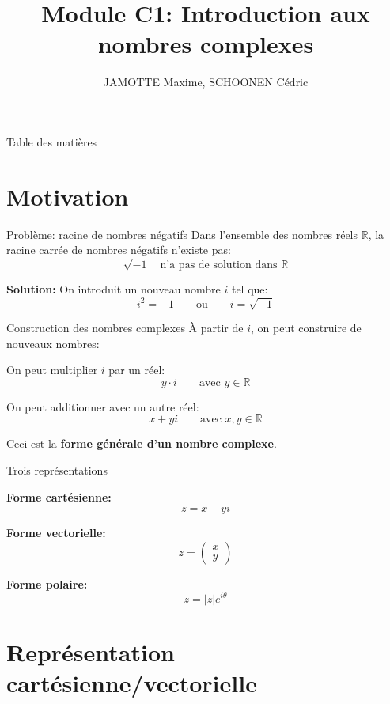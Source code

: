 \documentclass[aspectratio=169,12pt]{beamer}
\title[Module C1]{Module C1: Introduction aux nombres complexes}
\author{JAMOTTE Maxime, SCHOONEN Cédric}
\institute{Digital Learning Hub}
\date{}
\begin{document}
\begin{frame}
  \titlepage
\end{frame}

\begin{frame}{Table des matières}
  \tableofcontents
\end{frame}

\section{Motivation}

\begin{frame}{Problème: racine de nombres négatifs}
  Dans l'ensemble des nombres réels $\mathbb{R}$, la racine carrée de nombres négatifs n'existe pas:
  \[
    \sqrt{-1} \quad \text{n'a pas de solution dans } \mathbb{R}
  \]
  
  \bigskip
  \textbf{Solution:} On introduit un nouveau nombre $i$ tel que:
  \[
    i^2 = -1 \qquad \text{ou} \qquad i = \sqrt{-1}
  \]
\end{frame}

\begin{frame}{Construction des nombres complexes}
  À partir de $i$, on peut construire de nouveaux nombres:
  
  \bigskip
  On peut multiplier $i$ par un réel:
  \[
    y \cdot i \qquad \text{avec } y \in \mathbb{R}
  \]
  
  \bigskip
  On peut additionner avec un autre réel:
  \[
    x + yi \qquad \text{avec } x, y \in \mathbb{R}
  \]
  
  \bigskip
  Ceci est la \textbf{forme générale d'un nombre complexe}.
\end{frame}

\begin{frame}{Trois représentations}
  
  \bigskip
  \textbf{Forme cartésienne:}
  \[
    z = x + yi
  \]
  
  \textbf{Forme vectorielle:}
  \[
    z = \begin{pmatrix} x \\ y \end{pmatrix}
  \]
  
  \textbf{Forme polaire:}
  \[
    z = |z| e^{i\theta}
  \]
\end{frame}

\section{Représentation cartésienne/vectorielle}
\end{document}
